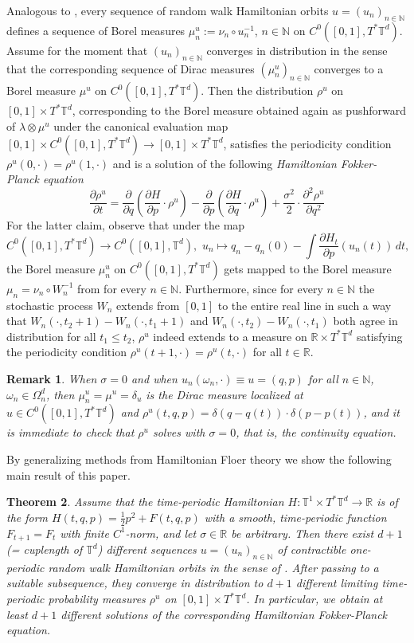 \documentclass[a4paper,11pt]{amsart}
\newcommand{\NN}{\mathbb{N}}
\newcommand{\RR}{\mathbb{R}}
\newcommand{\TT}{\mathbb{T}}
\newtheorem{theorem}{Theorem}[section]
\newtheorem{remark}[theorem]{Remark}
\begin{document}
Analogous to , every sequence of random walk Hamiltonian orbits $u=(u_n)_{n\in\NN}$ defines a sequence of Borel measures $\mu_n^u:=\nu_n\circ u_n^{-1}$, $n\in\NN$ on $C^0([0,1],T^*\TT^d)$. Assume for the moment that $(u_n)_{n\in\NN}$ converges in distribution in the sense that the corresponding sequence of Dirac measures $(\mu_n^u)_{n\in\NN}$ converges to a Borel measure $\mu^u$ on $C^0([0,1],T^*\TT^d)$. Then the distribution $\rho^u$ on $[0,1]\times T^*\TT^d$, corresponding to the Borel measure obtained again as pushforward of $\lambda\otimes\mu^u$ under the canonical evaluation map $[0,1]\times C^0([0,1],T^*\TT^d)\to [0,1]\times T^*\TT^d$, satisfies the periodicity condition $\rho^u(0,\cdot)=\rho^u(1,\cdot)$ and is a solution of the following \emph{Hamiltonian Fokker-Planck equation} \begin{equation}\label{Fokker-Planck}\frac{\partial\rho^u}{\partial t}=\frac{\partial}{\partial q}\left(\frac{\partial H}{\partial p}\cdot \rho^u\right)-\frac{\partial}{\partial p}\left(\frac{\partial H}{\partial q}\cdot \rho^u\right)+\frac{\sigma^2}{2}\cdot\frac{\partial^2\rho^u}{\partial q^2}\end{equation} For the latter claim, observe that under the map \[C^0([0,1],T^*\TT^d)\to C^0([0,1],\TT^d),\,\, u_n\mapsto q_n-q_n(0)-\int \frac{\partial H_t}{\partial p}(u_n(t))\,dt,\] the Borel measure $\mu_n^u$ on $C^0([0,1],T^*\TT^d)$ gets mapped to the Borel measure $\mu_n=\nu_n\circ W_n^{-1}$ from  for every $n\in\NN$. Furthermore, since for every $n\in\NN$ the stochastic process $W_n$ extends from $[0,1]$ to the entire real line in such a way that $W_n(\cdot,t_2+1)-W_n(\cdot,t_1+1)$ and $W_n(\cdot,t_2)-W_n(\cdot,t_1)$ both agree in distribution for all $t_1\leq t_2$, $\rho^u$ indeed extends to a measure on $\RR\times T^*\TT^d$ satisfying the periodicity condition $\rho^u(t+1,\cdot)=\rho^u(t,\cdot)$ for all $t\in\RR$.
\begin{remark} When $\sigma=0$ and when $u_n(\omega_n,\cdot)\equiv u=(q,p)$ for all $n\in\NN$, $\omega_n\in\Omega_n^d$, then $\mu_n^u=\mu^u=\delta_u$ is the Dirac measure localized at $u\in C^0([0,1],T^*\TT^d)$ and $\rho^u(t,q,p)=\delta(q-q(t))\cdot\delta(p-p(t))$, and it is immediate to check that $\rho^u$ solves  with $\sigma=0$, that is, the continuity equation. \end{remark}    
\indent By generalizing methods from Hamiltonian Floer theory we show the following main result of this paper.
\begin{theorem}\label{main}
Assume that the time-periodic Hamiltonian $H:\TT^1\times T^*\TT^d\to\RR$ is of the form $H(t,q,p)=\frac{1}{2}p^2+F(t,q,p)$ with a smooth, time-periodic function $F_{t+1}=F_t$ with finite $C^1$-norm, and let $\sigma\in\RR$ be arbitrary. Then there exist $d+1$ (= cuplength of $\TT^d$) different sequences $u=(u_n)_{n\in\NN}$ of contractible one-periodic random walk Hamiltonian orbits in the sense of . After passing to a suitable subsequence, they converge in distribution to $d+1$ different limiting time-periodic probability measures $\rho^u$ on $[0,1]\times T^*\TT^d$. In particular, we obtain at least $d+1$ different solutions of the corresponding Hamiltonian Fokker-Planck equation. 
\end{theorem}
\end{document}
